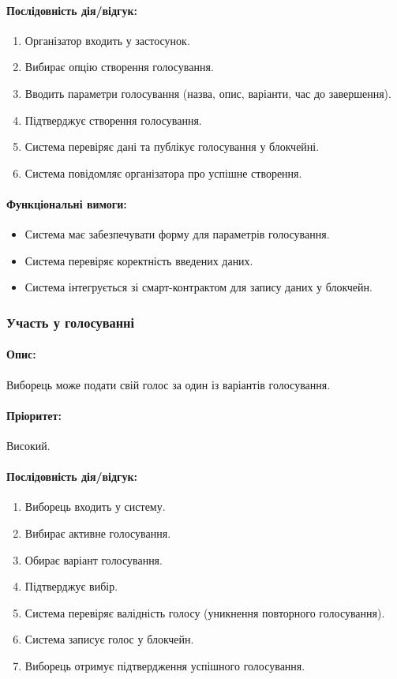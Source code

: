 \documentclass[14pt]{extreport}
\newcounter{req}[subsubsection]
\newcommand\req{\arabic{req}\stepcounter{req}}
\begin{document}
  \paragraph{Послідовність дія/відгук:}  
  \begin{enumerate}  
      \item Організатор входить у застосунок.  
      \item Вибирає опцію створення голосування.  
      \item Вводить параметри голосування (назва, опис, варіанти, час до завершення).  
      \item Підтверджує створення голосування.  
      \item Система перевіряє дані та публікує голосування у блокчейні.  
      \item Система повідомляє організатора про успішне створення.  
  \end{enumerate}
  \paragraph{Функціональні вимоги:}
  \begin{itemize}[leftmargin=*,label=REQ-.\req:]  
      \item Система має забезпечувати форму для параметрів голосування.
      \item Система перевіряє коректність введених даних.
      \item Система інтегрується зі смарт-контрактом для запису даних у блокчейн.  
  \end{itemize}

  \subsubsection{Участь у голосуванні}  
  \paragraph{Опис:} Виборець може подати свій голос за один із варіантів голосування.  
  \paragraph{Пріоритет:} Високий.  
  \paragraph{Послідовність дія/відгук:}  
  \begin{enumerate}  
      \item Виборець входить у систему.  
      \item Вибирає активне голосування.  
      \item Обирає варіант голосування.  
      \item Підтверджує вибір.  
      \item Система перевіряє валідність голосу (уникнення повторного голосування).  
      \item Система записує голос у блокчейн.  
      \item Виборець отримує підтвердження успішного голосування.  
  \end{enumerate}  
\end{document}
